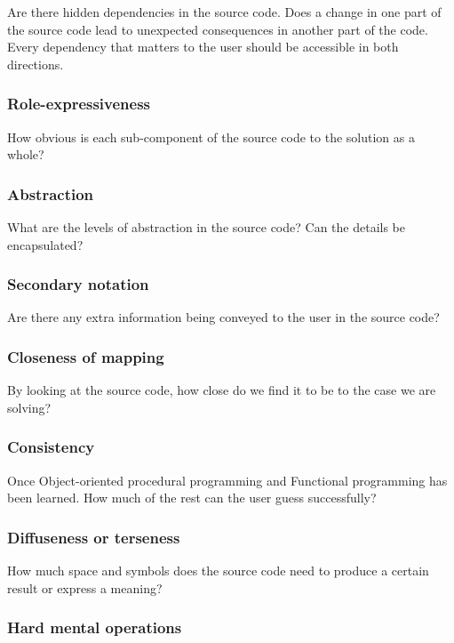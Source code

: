 \documentclass[12pt]{report}
\theoremstyle{definition}
\theoremstyle{theorem}
\begin{document}
Are there hidden dependencies in the source code. Does a change in one part of
the source code lead to unexpected consequences in another part of the code.
Every dependency that matters to the user should be accessible in both
directions. 

\subsubsection*{Role-expressiveness}

How obvious is each sub-component of the source code to the solution as a whole?

\subsubsection*{Abstraction}

What are the levels of abstraction in the source code? Can the details be
encapsulated?

\subsubsection*{Secondary notation}

Are there any extra information being conveyed to the user in the source code?

\subsubsection*{Closeness of mapping}

By looking at the source code, how close do we find it to be to the case
we are solving?

\subsubsection*{Consistency}

Once Object-oriented procedural programming and Functional programming has been
learned. How much of the rest can the user guess successfully? 

\subsubsection*{Diffuseness or terseness}

How much space and symbols does the source code need to produce a certain result
or express a meaning?

\subsubsection*{Hard mental operations}
\end{document}
